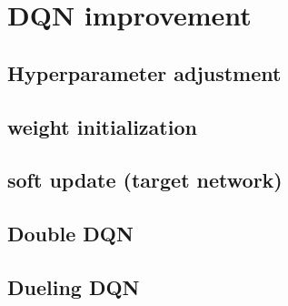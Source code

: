 \section{DQN improvement}
%
%

\subsection{Hyperparameter adjustment}

\subsection{weight initialization}

\subsection{soft update (target network)}

\subsection{Double DQN}

\subsection{Dueling DQN}




